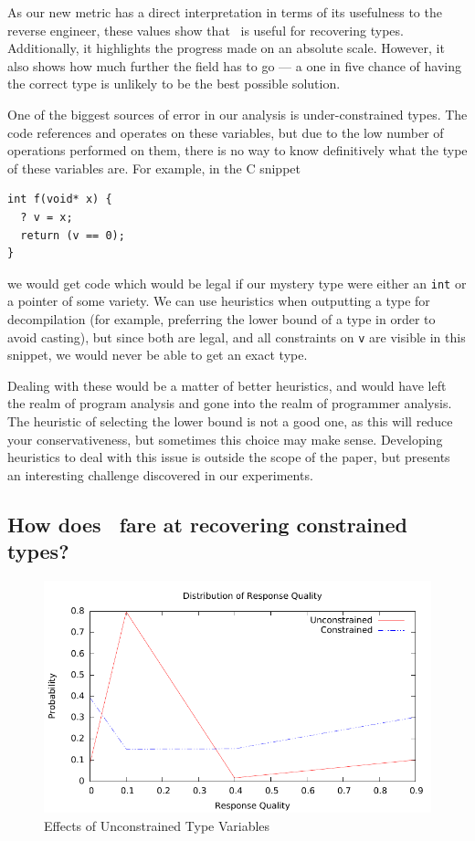As our new metric has a direct interpretation in terms of its usefulness to the reverse engineer, these values show that \bitr\ is useful for recovering types. Additionally, it highlights the progress made on an absolute scale. However, it also shows how much further the field has to go --- a one in five chance of having the correct type is unlikely to be the best possible solution.

One of the biggest sources of error in our analysis is under-constrained types. The code references and operates on these variables, but due to the low number of operations performed on them, there is no way to know definitively what the type of these variables are. For example, in the C snippet
\begin{verbatim}
int f(void* x) {
  ? v = x;
  return (v == 0);
}
\end{verbatim}
we would get code which would be legal if our mystery type were either an \texttt{int} or a pointer of some variety. We can use heuristics when outputting a type for decompilation (for example, preferring the lower bound of a type in order to avoid casting), but since both are legal, and all constraints on \texttt{v} are visible in this snippet, we would never be able to get an exact type.

Dealing with these would be a matter of better heuristics, and would have left the realm of program analysis and gone into the realm of programmer analysis. The heuristic of selecting the lower bound is not a good one, as this will reduce your conservativeness, but sometimes this choice may make sense. Developing heuristics to deal with this issue is outside the scope of the paper, but presents an interesting challenge discovered in our experiments.

\subsection{How does \bitr\ fare at recovering constrained types?}
\begin{figure}
\includegraphics[scale=0.60]{bitr/quality.pdf}
\caption{Effects of Unconstrained Type Variables}
\label{fig:unconst}
\end{figure}

